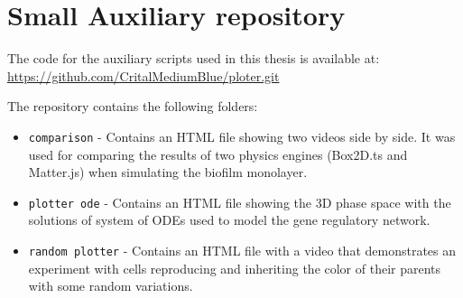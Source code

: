 \section{Small Auxiliary repository}

The code for the auxiliary scripts used in this thesis is available at:\\

\url{https://github.com/CritalMediumBlue/ploter.git}

The repository contains the following folders:

\begin{itemize}
	\item \texttt{comparison} - Contains an HTML file showing two videos side by side. It was used for comparing the results of two physics engines (Box2D.ts and Matter.js) when simulating the biofilm monolayer.
	\item \texttt{plotter ode} - Contains an HTML file showing the 3D phase space with the solutions of system of ODEs used to model the gene regulatory network.
	\item \texttt{random plotter} - Contains an HTML file with a video that demonstrates an experiment with cells reproducing and inheriting the color of their parents with some random variations.
\end{itemize}

